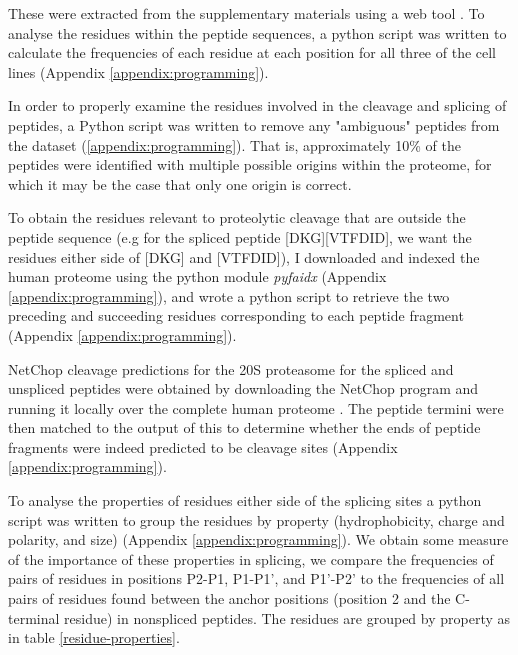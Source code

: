 \documentclass[10pt,a4paper,twoside,twocolumn]{article}
\begin{document}
These were extracted from the supplementary materials using a web tool \cite{pdftoxls}. To analyse the residues within the peptide sequences, a python script was written to calculate the frequencies of each residue at each position for all three of the cell lines (Appendix \ref{appendix:programming}).

In order to properly examine the residues involved in the cleavage and splicing of peptides, a Python script was written  to remove any "ambiguous" peptides from the dataset (\ref{appendix:programming}). That is, approximately 10\% of the peptides were identified with multiple possible origins within the proteome, for which it may be the case that only one origin is correct. 

To obtain the residues relevant to proteolytic cleavage that are outside the peptide sequence (e.g for the spliced peptide [DKG][VTFDID], we want the residues either side of [DKG] and [VTFDID]), I downloaded and indexed the human proteome using the python module \textit{pyfaidx} (Appendix \ref{appendix:programming}), and wrote a python script to retrieve the two preceding and succeeding residues corresponding to each peptide fragment (Appendix \ref{appendix:programming}).

NetChop cleavage predictions for the 20S proteasome for the spliced and unspliced peptides were obtained by downloading the NetChop program and running it locally over the complete human proteome \cite{Nielsen2005}. The peptide termini were then matched to the output of this to determine whether the ends of peptide fragments were indeed predicted to be cleavage sites (Appendix \ref{appendix:programming}).

To analyse the properties of residues either side of the splicing sites a python script was written to group the residues by property (hydrophobicity, charge and polarity, and size) (Appendix \ref{appendix:programming}). We obtain some measure of the importance of these properties in splicing, we compare the frequencies of pairs of residues in positions P2-P1, P1-P1', and P1'-P2' to the frequencies of all pairs of residues found between the anchor positions (position 2 and the C-terminal residue) in nonspliced peptides. The residues are grouped by property as in table \ref{residue-properties}.
\end{document}
